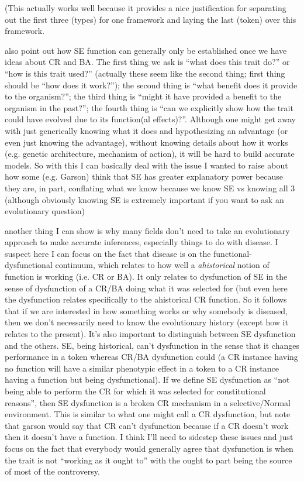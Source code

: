 \documentclass{article}
\begin{document}
(This actually works well because it provides a nice justification for separating out the first three (types) for one framework and laying the last (token) over this framework.

also point out how SE function can generally only be established once we have ideas about CR and BA. The first thing we ask is ``what does this trait do?'' or ``how is this trait used?'' (actually these seem like the second thing; first thing should be ``how does it work?''); the second thing is ``what benefit does it provide to the organism?''; the third thing is ``might it have provided a benefit to the organism in the past?''; the fourth thing is ``can we explicitly show how the trait could have evolved due to its function(al effects)?''.
Although one might get away with just generically knowing what it does and hypothesizing an advantage (or even just knowing the advantage), without knowing details about how it works (e.g. genetic architecture, mechanism of action), it will be hard to build accurate models.
So with this I can basically deal with the issue I wanted to raise about how some (e.g. Garson) think that SE has greater explanatory power because they are, in part, conflating what we know because we know SE vs knowing all 3 (although obviously knowing SE is extremely important if you want to ask an evolutionary question)

another thing I can show is why many fields don't need to take an evolutionary approach to make accurate inferences, especially things to do with disease. I suspect here I can focus on the fact that disease is on the functional-dysfunctional continuum, which relates to how well a \emph{ahistorical} notion of function is working (i.e. CR or BA). It only relates to dysfunction of SE in the sense of dysfunction of a CR/BA doing what it was selected for (but even here the dysfunction relates specifically to the ahistorical CR function. So it follows that if we are interested in how something works or why somebody is diseased, then we don't necessarily need to know the evolutionary history (except how it relates to the present). It's also important to distinguish between SE dysfunction and the others. SE, being historical, can't dysfunction in the sense that it changes performance in a token whereas CR/BA dysfunction could (a CR instance having no function will have a similar phenotypic effect in a token to a CR instance having a function but being dysfunctional). If we define SE dysfunction as ``not being able to perform the CR for which it was selected for constitutional reasons'', then SE dysfunction is a broken CR mechanism in a selective/Normal environment. This is similar to what one might call a CR dysfunction, but note that garson would say that CR can't dysfunction because if a CR doesn't work then it doesn't have a function. I think I'll need to sidestep these issues and just focus on the fact that everybody would generally agree that dysfunction is when the trait is not ``working as it ought to'' with the ought to part being the source of most of the controversy.
\end{document}
